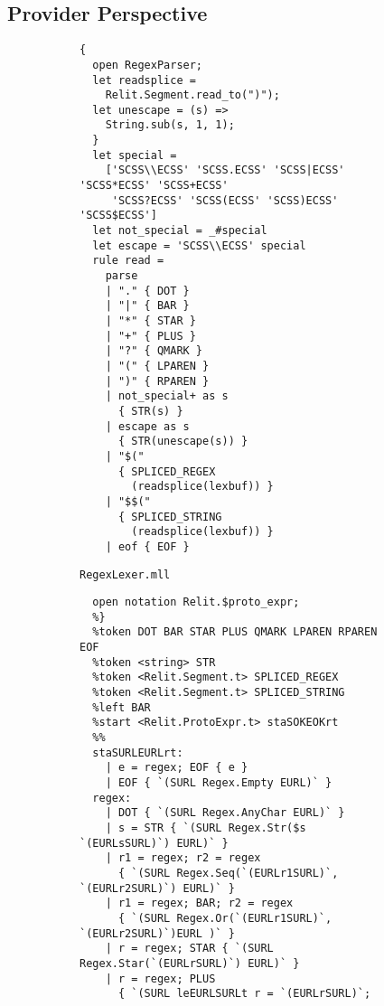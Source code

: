 \documentclass[acmsmall,screen]{acmart}
\newcommand{\li}[1]{\lstinline[basicstyle=\ttfamily\fontsize{9pt}{1em}\selectfont]{#1}}
\begin{document}
\subsection{Provider Perspective}
\label{sec:provider-perspective}
\vspace{-1px}
\begin{figure}
\begin{subfigure}[t]{0.30\textwidth}
\vspace{-8px}
\begin{lstlisting}[morekeywords={rule,parse,eof}]
  { 
  open RegexParser;
  let readsplice = 
    Relit.Segment.read_to(")");
  let unescape = (s) => 
    String.sub(s, 1, 1); 
  }
  let special = 
    ['SCSS\\ECSS' 'SCSS.ECSS' 'SCSS|ECSS' 'SCSS*ECSS' 'SCSS+ECSS' 
     'SCSS?ECSS' 'SCSS(ECSS' 'SCSS)ECSS' 'SCSS$ECSS']
  let not_special = _#special
  let escape = 'SCSS\\ECSS' special
  rule read = 
    parse
    | "." { DOT }
    | "|" { BAR }
    | "*" { STAR }
    | "+" { PLUS }
    | "?" { QMARK }
    | "(" { LPAREN }
    | ")" { RPAREN }
    | not_special+ as s
      { STR(s) }
    | escape as s
      { STR(unescape(s)) }
    | "$(" 
      { SPLICED_REGEX
        (readsplice(lexbuf)) }
    | "$$("  
      { SPLICED_STRING
        (readsplice(lexbuf)) }
    | eof { EOF }
\end{lstlisting}
\vspace{-5px}
\caption{\li{RegexLexer.mll}}
\label{fig:regex-lexer}
\end{subfigure}
\hfill
\begin{subfigure}[t]{0.61\textwidth}
\vspace{-8px}
\begin{lstlisting}[morekeywords={token,left,start},stringstyle=\ttfamily\color{black}]
  %{ 
  open notation Relit.$proto_expr; 
  %}
  %token DOT BAR STAR PLUS QMARK LPAREN RPAREN EOF
  %token <string> STR
  %token <Relit.Segment.t> SPLICED_REGEX 
  %token <Relit.Segment.t> SPLICED_STRING
  %left BAR
  %start <Relit.ProtoExpr.t> staSOKEOKrt
  %%
  staSURLEURLrt:
    | e = regex; EOF { e }
    | EOF { `(SURL Regex.Empty EURL)` }
  regex:
    | DOT { `(SURL Regex.AnyChar EURL)` }
    | s = STR { `(SURL Regex.Str($s `(EURLsSURL)`) EURL)` }
    | r1 = regex; r2 = regex 
      { `(SURL Regex.Seq(`(EURLr1SURL)`, `(EURLr2SURL)`) EURL)` }
    | r1 = regex; BAR; r2 = regex 
      { `(SURL Regex.Or(`(EURLr1SURL)`, `(EURLr2SURL)`)EURL )` }
    | r = regex; STAR { `(SURL Regex.Star(`(EURLrSURL)`) EURL)` }
    | r = regex; PLUS
      { `(SURL leEURLSURLt r = `(EURLrSURL)`;

\end{lstlisting}
\end{subfigure}
\end{figure}
\end{document}
